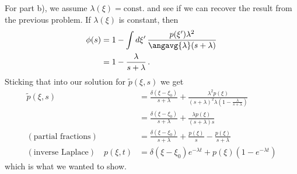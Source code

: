For part b), we assume $\lambda(\xi) = \text{const.}$ and see if we can recover the result from the previous problem.
If $\lambda(\xi)$ is constant, then
\begin{align}
  \phi(s)
  &= 1 - \int d\xi' \, \frac{p(\xi') \lambda^2}{\angavg{\lambda}(s + \lambda)} \nonumber \\
  &= 1 - \frac{\lambda}{s + \lambda}
  \, .
\end{align}
Sticking that into our solution for $\tilde{p}(\xi, s)$ we get
\begin{align}
  \tilde{p}(\xi, s)
  &= \frac{\delta(\xi - \xi_0)}{s + \lambda}
  + \frac{\lambda^2 p(\xi)}{(s + \lambda)^2 \lambda \left( 1 - \frac{\lambda}{s + \lambda}\right)} \nonumber \\
  &= \frac{\delta(\xi - \xi_0)}{s + \lambda}
  + \frac{\lambda p(\xi)}{(s + \lambda) s} \nonumber \\
  (\text{partial fractions}) \quad
  &= \frac{\delta(\xi - \xi_0)}{s + \lambda} + \frac{p(\xi)}{s} - \frac{p(\xi)}{s + \lambda} \nonumber \\
  (\text{inverse Laplace}) \quad
  p(\xi, t) &= \delta(\xi - \xi_0) e^{-\lambda t} + p(\xi) \left( 1 - e^{-\lambda t} \right) \nonumber
\end{align}
which is what we wanted to show.
